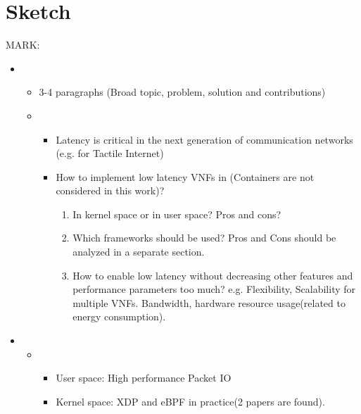 \section{Sketch}
\label{sec:sketch}

MARK:  

\begin{itemize}[ $\leftarrow$ we keep the sketch of the storyline currently here only to have a overall view for the draft. This part will be deleted later on]
    \item \begin{itemize}[Introduction]
        \item 3-4 paragraphs (Broad topic, problem, solution and contributions)
        \item   \begin{itemize}[Motivation]
            \item Latency is critical in the next generation of communication networks (e.g. for Tactile Internet)
            \item {} How to implement low latency VNFs in (Containers are
                not considered in this work)?
                \begin{enumerate}
                    \item In kernel space or in user space? Pros and cons?
                    \item Which frameworks should be used? Pros and Cons should be analyzed in a separate section.
                    \item How to enable low latency without decreasing other features and performance parameters too
                        much? e.g. Flexibility, Scalability for multiple VNFs. Bandwidth, hardware resource usage(related to
                        energy consumption). 
                \end{enumerate}
        \end{itemize}
\end{itemize}

\item \begin{itemize}[Related Work]

    \item \begin{itemize}[Packet IO frameworks related papers]
        \item User space: High performance Packet IO
        \item Kernel space: XDP and eBPF in practice(2 papers are found).
    \end{itemize}


\end{itemize}
\end{itemize}
